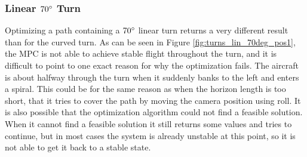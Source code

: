 \subsubsection{Linear $70\degree$ Turn}

Optimizing a path containing a $70\degree$ linear turn returns a very different result than for the curved turn. As can be seen in Figure \ref{fig:turns_lin_70deg_pos1}, the MPC is not able to achieve stable flight throughout the turn, and it is difficult to point to one exact reason for why the optimization fails. The aircraft is about halfway through the turn when it suddenly banks to the left and enters a spiral. This could be for the same reason as when the horizon length is too short, that it tries to cover the path by moving the camera position using roll. It is also possible that the optimization algorithm could not find a feasible solution. When it cannot find a feasible solution it still returns some values and tries to continue, but in most cases the system is already unstable at this point, so it is not able to get it back to a stable state.

